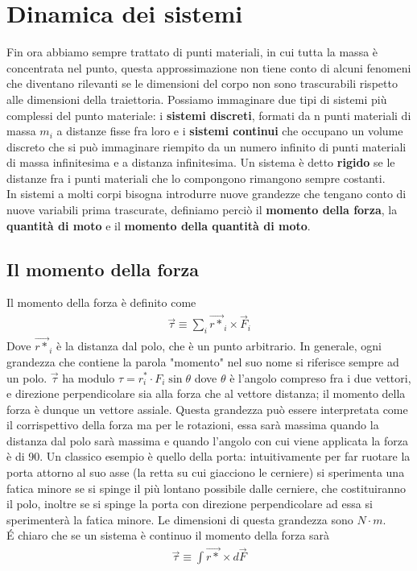 \section{Dinamica dei sistemi}
Fin ora abbiamo sempre trattato di punti materiali, in cui tutta la massa è concentrata nel punto, questa approssimazione non tiene conto di alcuni fenomeni che diventano rilevanti se le dimensioni del corpo non sono trascurabili rispetto alle dimensioni della traiettoria. Possiamo immaginare due tipi di sistemi più complessi del punto materiale: i \textbf{sistemi discreti}, formati da n punti materiali di massa $m_i$ a distanze fisse fra loro e i \textbf{sistemi continui} che occupano un volume discreto che si può immaginare riempito da un numero infinito di punti materiali di massa infinitesima e a distanza infinitesima. Un sistema è detto \textbf{rigido} se le distanze fra i punti materiali che lo compongono rimangono sempre costanti.\\
In sistemi a molti corpi bisogna introdurre nuove grandezze che tengano conto di nuove variabili prima trascurate, definiamo perciò il \textbf{momento della forza}, la \textbf{quantità di moto} e il \textbf{momento della quantità di moto}.
\subsection{Il momento della forza}
Il momento della forza è definito come
\begin{align*}
\vec{\tau} \equiv \sum_i\vec{r*}_i \times \vec{F}_i
\end{align*}
Dove $\vec{r*}_i$ è la distanza dal polo, che è un punto arbitrario. In generale, ogni grandezza che contiene la parola "momento" nel suo nome si riferisce sempre ad un polo. $\vec{\tau}$ ha modulo $\tau = r^*_i\cdot F_i \sin\theta$ dove $\theta$ è l'angolo compreso fra i due vettori, e direzione perpendicolare sia alla forza che al vettore distanza; il momento della forza è dunque un vettore assiale. Questa grandezza può essere interpretata come il corrispettivo della forza ma per le rotazioni, essa sarà massima quando la distanza dal polo sarà massima e quando l'angolo con cui viene applicata la forza è di 90\textdegree. Un classico esempio è quello della porta: intuitivamente per far ruotare la porta attorno al suo asse (la retta su cui giacciono le cerniere) si sperimenta una fatica minore se si spinge il più lontano possibile dalle cerniere, che costituiranno il polo, inoltre se si spinge la porta con direzione perpendicolare ad essa si sperimenterà la fatica minore. Le dimensioni di questa grandezza sono $N\cdot m$.\\
\'{E} chiaro che se un sistema è continuo il momento della forza sarà
\begin{align*}
	\vec{\tau} \equiv \int \vec{r*} \times d\vec{F}
\end{align*}
